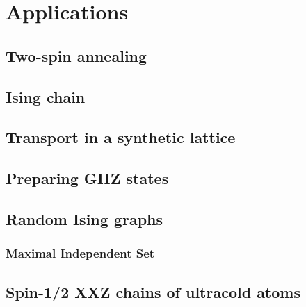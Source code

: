 \chapter{Applications}

\section{Two-spin annealing}

\section{Ising chain}

\section{Transport in a synthetic lattice}

\section{Preparing GHZ states}

\section{Random Ising graphs}

\subsection{Maximal Independent Set}

\section{Spin-1/2 XXZ chains of ultracold atoms}